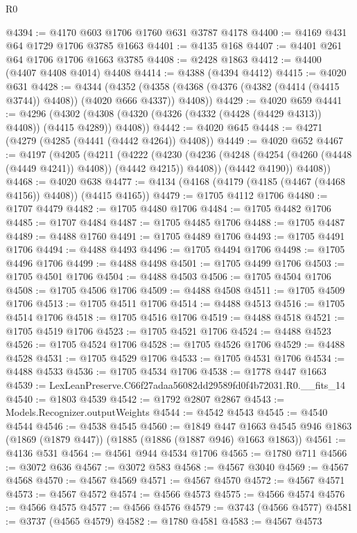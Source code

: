 \begin{lexlean}{R0}
\begin{coremodule}
@4394 := @4170 @603 @1706 @1760 @631 @3787 @4178
@4400 := @4169 @431 @64 @1729 @1706 @3785 @1663
@4401 := @4135 @168
@4407 := @4401 @261 @64 @1706 @1706 @1663 @3785
@4408 := @2428 @1863
@4412 := @4400 (@4407 @4408 @4014) @4408
@4414 := @4388 (@4394 @4412)
@4415 := @4020 @631
@4428 := @4344
    (@4352 (@4358 (@4368 (@4376 (@4382 (@4414 (@4415 @3744)) @4408)) (@4020 @666 @4337)) @4408))
@4429 := @4020 @659
@4441 := @4296
    (@4302 (@4308 (@4320 (@4326 (@4332 (@4428 (@4429 @4313)) @4408)) (@4415 @4289)) @4408))
@4442 := @4020 @645
@4448 := @4271 (@4279 (@4285 (@4441 (@4442 @4264)) @4408))
@4449 := @4020 @652
@4467 := @4197
    (@4205
      (@4211
        (@4222
          (@4230 (@4236 (@4248 (@4254 (@4260 (@4448 (@4449 @4241)) @4408)) (@4442 @4215)) @4408))
          (@4442 @4190))
        @4408))
@4468 := @4020 @638
@4477 := @4134 (@4168 (@4179 (@4185 (@4467 (@4468 @4156)) @4408)) (@4415 @4165))
@4479 := @1705 @4112 @1706
@4480 := @1707 @4479
@4482 := @1705 @4480 @1706
@4484 := @1705 @4482 @1706
@4485 := @1707 @4484
@4487 := @1705 @4485 @1706
@4488 := @1705 @4487
@4489 := @4488 @1760
@4491 := @1705 @4489 @1706
@4493 := @1705 @4491 @1706
@4494 := @4488 @4493
@4496 := @1705 @4494 @1706
@4498 := @1705 @4496 @1706
@4499 := @4488 @4498
@4501 := @1705 @4499 @1706
@4503 := @1705 @4501 @1706
@4504 := @4488 @4503
@4506 := @1705 @4504 @1706
@4508 := @1705 @4506 @1706
@4509 := @4488 @4508
@4511 := @1705 @4509 @1706
@4513 := @1705 @4511 @1706
@4514 := @4488 @4513
@4516 := @1705 @4514 @1706
@4518 := @1705 @4516 @1706
@4519 := @4488 @4518
@4521 := @1705 @4519 @1706
@4523 := @1705 @4521 @1706
@4524 := @4488 @4523
@4526 := @1705 @4524 @1706
@4528 := @1705 @4526 @1706
@4529 := @4488 @4528
@4531 := @1705 @4529 @1706
@4533 := @1705 @4531 @1706
@4534 := @4488 @4533
@4536 := @1705 @4534 @1706
@4538 := @1778 @447 @1663
@4539 := LexLeanPreserve.C66f27adaa56082dd29589fd0f4b72031.R0.__fits_14
@4540 := @1803 @4539
@4542 := @1792 @2807 @2867
@4543 := Models.Recognizer.outputWeights
@4544 := @4542 @4543
@4545 := @4540 @4544
@4546 := @4538 @4545
@4560 := @1849
    @447
    @1663
    @4545
    @946
    @1863
    (@1869 (@1879 @447))
    (@1885 (@1886 (@1887 @946) @1663 @1863))
@4561 := @4136 @531
@4564 := @4561 @944 @4534 @1706
@4565 := @1780 @711
@4566 := @3072 @636
@4567 := @3072 @583
@4568 := @4567 @3040
@4569 := @4567 @4568
@4570 := @4567 @4569
@4571 := @4567 @4570
@4572 := @4567 @4571
@4573 := @4567 @4572
@4574 := @4566 @4573
@4575 := @4566 @4574
@4576 := @4566 @4575
@4577 := @4566 @4576
@4579 := @3743 (@4566 @4577)
@4581 := @3737 (@4565 @4579)
@4582 := @1780 @4581
@4583 := @4567 @4573

\end{coremodule}
\end{lexlean}
